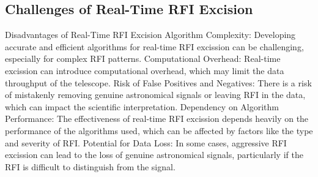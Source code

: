 \subsection{Challenges of Real-Time RFI Excision}
\label{subsection:hardware:introduction:challenges}

Disadvantages of Real-Time RFI Excision
Algorithm Complexity: Developing accurate and efficient algorithms for real-time RFI excission can be challenging, especially for complex RFI patterns.
Computational Overhead: Real-time excission can introduce computational overhead, which may limit the data throughput of the telescope.
Risk of False Positives and Negatives: There is a risk of mistakenly removing genuine astronomical signals or leaving RFI in the data, which can impact the scientific interpretation.
Dependency on Algorithm Performance: The effectiveness of real-time RFI excission depends heavily on the performance of the algorithms used, which can be affected by factors like the type and severity of RFI.
Potential for Data Loss: In some cases, aggressive RFI excission can lead to the loss of genuine astronomical signals, particularly if the RFI is difficult to distinguish from the signal.



